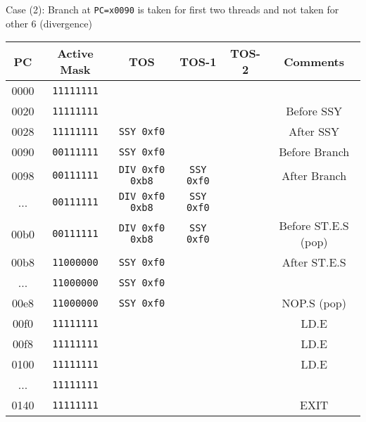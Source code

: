 \documentclass[11pt]{article}
\begin{document}
Case (2): Branch at \verb|PC=x0090| is taken for first two threads and not taken for other 6 (divergence)
\begin{table}[H]
    \centering %
    \begin{tabular}{c c c c c c} %
    \hline\hline %
    PC & Active Mask & TOS & TOS-1 & TOS-2 & Comments \\ [0.5ex] %
    \hline %
    0000 & \verb|11111111| & & & & \\
    0020 & \verb|11111111| & & & & Before SSY \\
    0028 & \verb|11111111| & \verb|SSY 0xf0| & & & After SSY \\
    0090 & \verb|00111111| & \verb|SSY 0xf0| & & & Before Branch \\
    0098 & \verb|00111111| & \verb|DIV 0xf0 0xb8| & \verb|SSY 0xf0| & & After Branch \\
    ...  & \verb|00111111| & \verb|DIV 0xf0 0xb8| & \verb|SSY 0xf0| & & \\
    00b0 & \verb|00111111| & \verb|DIV 0xf0 0xb8| & \verb|SSY 0xf0| & & Before ST.E.S (pop)\\
    00b8 & \verb|11000000| & \verb|SSY 0xf0| & & & After ST.E.S \\
    ...  & \verb|11000000| & \verb|SSY 0xf0| & & & \\
    00e8 & \verb|11000000| & \verb|SSY 0xf0| & & & NOP.S (pop)\\
    00f0 & \verb|11111111| & & & & LD.E \\
    00f8 & \verb|11111111| & & & & LD.E \\
    0100 & \verb|11111111| & & & & LD.E \\
    ...  & \verb|11111111| & & & & \\
    0140 & \verb|11111111| & & & & EXIT \\
\hline %
\end{tabular}
\label{table:nonlin} %
\end{table}
\newpage
\end{document}
